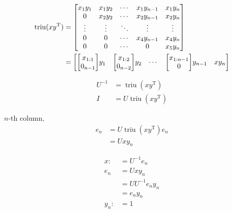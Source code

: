 \documentclass[11pt]{article}
\newcommand{\triu}{\mathop{\mathrm{triu}}}
\newcommand{\T}{\mathrm{T}}
\begin{document}
\begin{align*}
    \triu(xy^{\T}) &= \mqty[
        x_{1} y_{1} & x_{1} y_{2} & \cdots & x_{1} y_{n-1} & x_{1} y_{n}\\
        0 & x_{2} y_{2} & \cdots & x_{2} y_{n-1} & x_{2} y_{n}\\
        \vdots & \vdots & \ddots & \vdots & \vdots\\
        0 & 0 & \cdots & x_{4} y_{n-1} & x_{4} y_{n}\\
        0 & 0 & \cdots & 0 & x_{5} y_{n}
        ]\\
    &= \mqty[
        \mqty[
            x_{1:1} \\
            0_{n-1}
            ]y_{1} &
        \mqty[
            x_{1:2} \\
            0_{n-2}
            ]y_{2} &
        \cdots &
        \mqty[
            x_{1:n-1} \\
            0
            ]y_{n-1} &
        x y_{n} 
        ]
\end{align*}


\begin{align*}
    U^{-1} &= \triu(xy^{\T}) \\
    I &= U \triu(xy^{\T})
\end{align*}

$n$-th column, 
\begin{align*}
    e_{n} &= U \triu(xy^{\T})e_{n} \\
    &= U x y_{n}    
\end{align*}




\begin{align*}
    x :&= U^{-1} e_{n} \\
    e_{n} &= U x y_{n} \\
        &= U U^{-1} e_{n} y_{n} \\
        &= e_{n} y_{n} \\
    y_n :&= 1
\end{align*}
\end{document}
